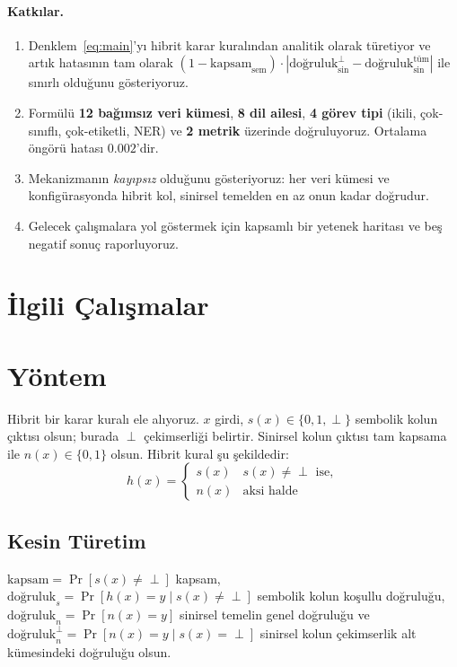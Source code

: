 \documentclass[11pt,a4paper]{article}
\begin{document}
\paragraph{Katkılar.}
\begin{enumerate}
\item Denklem~\ref{eq:main}'yı hibrit karar kuralından analitik olarak
türetiyor ve artık hatasının tam olarak
$(1-\text{kapsam}_{\text{sem}}) \cdot
|\text{doğruluk}_{\text{sin}}^{\perp} -
\text{doğruluk}_{\text{sin}}^{\text{tüm}}|$ ile sınırlı olduğunu
gösteriyoruz.
\item Formülü \textbf{12 bağımsız veri kümesi}, \textbf{8 dil ailesi},
\textbf{4 görev tipi} (ikili, çok-sınıflı, çok-etiketli, NER) ve
\textbf{2 metrik} üzerinde doğruluyoruz.
Ortalama öngörü hatası $0.002$'dir.
\item Mekanizmanın \emph{kayıpsız} olduğunu gösteriyoruz: her veri
kümesi ve konfigürasyonda hibrit kol, sinirsel temelden en az onun
kadar doğrudur.
\item Gelecek çalışmalara yol göstermek için kapsamlı bir yetenek
haritası ve beş negatif sonuç raporluyoruz.
\end{enumerate}

\section{İlgili Çalışmalar}
\label{sec:ilgili}


\section{Yöntem}
\label{sec:yontem}
Hibrit bir karar kuralı ele alıyoruz. $x$ girdi,
$s(x) \in \{0,1,\perp\}$ sembolik kolun çıktısı olsun; burada $\perp$
çekimserliği belirtir. Sinirsel kolun çıktısı tam kapsama ile
$n(x) \in \{0,1\}$ olsun. Hibrit kural şu şekildedir:
\begin{equation}
h(x) =
\begin{cases}
s(x) & s(x) \neq \perp \text{ ise}, \\
n(x) & \text{aksi halde}
\end{cases}
\end{equation}

\subsection{Kesin Türetim}
$\text{kapsam} = \Pr[s(x) \neq \perp]$ kapsam,
$\text{doğruluk}_s = \Pr[h(x) = y \mid s(x) \neq \perp]$ sembolik
kolun koşullu doğruluğu, $\text{doğruluk}_n = \Pr[n(x) = y]$ sinirsel
temelin genel doğruluğu ve
$\text{doğruluk}_n^{\perp} = \Pr[n(x) = y \mid s(x) = \perp]$
sinirsel kolun çekimserlik alt kümesindeki doğruluğu olsun.
\end{document}
